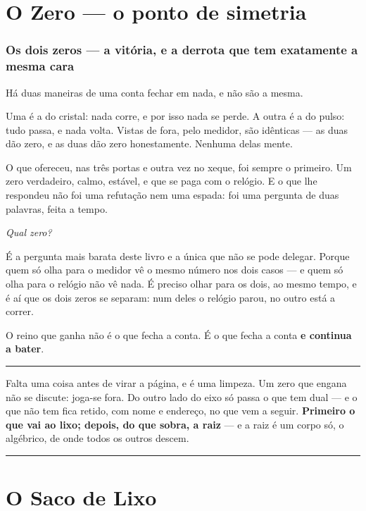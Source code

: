 \documentclass[livro.tex]{subfiles}
\begin{document}
\part{O Zero --- o ponto de simetria}

\section{Os dois zeros --- a vitória, e a derrota que tem exatamente a mesma cara}

Há duas maneiras de uma conta fechar em nada, e não são a mesma.

Uma é a do cristal: nada corre, e por isso nada se perde. A outra é a do pulso: tudo passa,
e nada volta. Vistas de fora, pelo medidor, são idênticas --- as duas dão zero, e as duas
dão zero honestamente. Nenhuma delas mente.

O que \Drk ofereceu, nas três portas e outra vez no xeque, foi sempre o primeiro. Um zero
verdadeiro, calmo, estável, e que se paga com o relógio. E o que \Ben lhe respondeu não foi
uma refutação nem uma espada: foi uma pergunta de duas palavras, feita a tempo.

\emph{Qual zero?}

É a pergunta mais barata deste livro e a única que não se pode delegar. Porque quem só olha
para o medidor vê o mesmo número nos dois casos --- e quem só olha para o relógio não vê
nada. É preciso olhar para os dois, ao mesmo tempo, e é aí que os dois zeros se separam:
num deles o relógio parou, no outro está a correr.

O reino que ganha não é o que fecha a conta. É o que fecha a conta \textbf{e continua a bater}.

\vspace{2mm}\hrule\vspace{3mm}

\noindent Falta uma coisa antes de virar a página, e é uma limpeza. Um zero que engana não se
discute: joga-se fora. Do outro lado do eixo só passa o que tem dual --- e o que não tem fica
retido, com nome e endereço, no que vem a seguir. \textbf{Primeiro o que vai ao lixo; depois, do
que sobra, a raiz} --- e a raiz é um corpo só, o algébrico, de onde todos os outros descem.


\vspace{2mm}\hrule\vspace{3mm}

\part{O Saco de Lixo}
\end{document}
